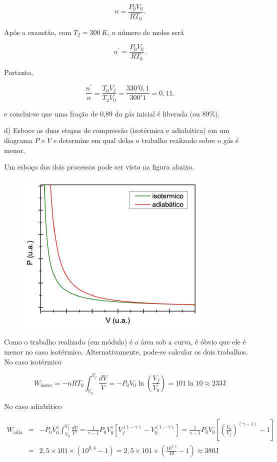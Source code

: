 \begin{enumerate}[start=1,label={\bfseries Q\arabic*.}]
{$$
n = \frac{P_{0}V_{0}}{RT_{0}}.
$$

Após a exaustão, com $T_{2} = 300 \ K$, o número de moles será

$$
n^{\prime} = \frac{P_{0}V_{0}}{RT_{0}}.
$$


Portanto,

$$
\frac{n^{\prime}}{n} = \frac{T_{0}V_{f}}{T_{2}V_{0}} = \frac{330 \prime 0,1}{300 \prime 1} = 0,11.
$$

e conclui-se que uma fração de 0,89 do gás inicial é liberada (ou $89\%$).

}

d) Esboce as duas etapas de compressão (isotérmica e adiabática) em um diagrama $P \times V$ e
determine em qual delas o trabalho realizado sobre o gás é menor.

{\color{red}

Um esboço dos dois processos pode ser visto na figura abaixo.

\begin{figure}[H]
  \centering
  \includegraphics[scale=0.5]{termica-img/isoter.png}
\end{figure}

Como o trabalho realizado (em módulo) é a área sob a curva, é óbvio que ele é menor no caso isotérmico. Alternativamente, pode-se calcular os dois trabalhos. No caso isotérmico

$$
W_{\text{isoter}} = -n R T_{0} \int_{V_{0}}^{V_{f}} \frac{d V}{V} = -P_{0} V_{0} \ln \left(\frac{V_{f}}{V_{0}}\right) = 101 \ln 10 \approx 233 \mathrm{J}
$$

No caso adiabático


\begin{eqnarray*}
W_{\text{adia}} &=& -P_{0} V_{0}^{\gamma} \int_{V_{0}}^{V_{f}} \frac{d V}{V^{\gamma}}=\frac{1}{\gamma-1} P_{0} V_{0}^{\gamma}\left[V_{f}^{(1-\gamma)}-V_{0}^{(1-\gamma)}\right]=\frac{1}{\gamma-1} P_{0} V_{0}\left[\left(\frac{V_{0}}{V_{f}}\right)^{(\gamma-1)}-1\right] \\
&=& 2,5 \times 101 \times\left(10^{0,4}-1\right)=2,5 \times 101 \times\left(\frac{10^{1,4}}{10}-1\right) \approx 380 \mathrm{J}
\end{eqnarray*}


}
\end{enumerate}
